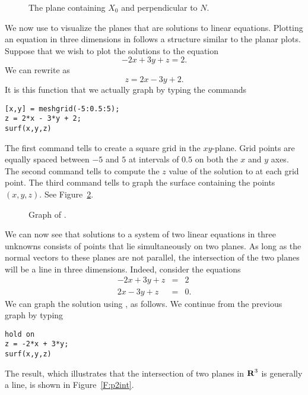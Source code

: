 \begin{figure}[htb]
              \centerline{%
              }
              \caption{The plane containing $X_0$ and perpendicular to $N$.}
              \label{F:plane}
\end{figure}


We now use \Matlab to visualize the planes that are solutions to
linear equations.  Plotting an equation in three dimensions in
\Matlab follows a structure similar to the planar plots.
Suppose that we wish to plot the solutions to the equation
\begin{equation} \label{-2x+3y+z=2}
-2x+3y+z=2.
\end{equation}
We can rewrite  as
\[
z=2x-3y+2.
\]
It is this function that we actually graph by typing the
commands
\begin{verbatim}
[x,y] = meshgrid(-5:0.5:5);
z = 2*x - 3*y + 2;
surf(x,y,z)
\end{verbatim}   
The first command tells \Matlab to create a square grid in the
$xy$-plane.  Grid points are
equally spaced between $-5$ and $5$ at intervals of $0.5$ on
both the $x$ and $y$ axes. The second command tells \Matlab to
compute the $z$ value of the solution to  at
each grid point.  The third command tells \Matlab to graph the
surface containing the points $(x,y,z)$.  See
Figure~\ref{F:p1int}.

\begin{figure}[htb]
              \centerline{%
              }
              \caption{Graph of \protect{}.}
              \label{F:p1int}
\end{figure}


We can now see that solutions to a system of two linear
equations in three unknowns consists of points that lie
simultaneously on two planes.  As long as the normal vectors to
these planes are not parallel, the intersection of the two
planes will be a line in three dimensions.  Indeed, consider the
equations
\begin{eqnarray*}
-2x + 3y + z & = & 2 \\
 2x - 3y + z & = & 0.
\end{eqnarray*}
We can graph the solution using \Matlab, as follows. We continue
from the previous graph by typing
\begin{verbatim}
hold on
z = -2*x + 3*y;
surf(x,y,z)
\end{verbatim}
The result, which illustrates that the intersection of two planes
in $\mbox{$\bf{R}$}^3$ is generally a line, is shown in Figure~\ref{F:p2int}.

